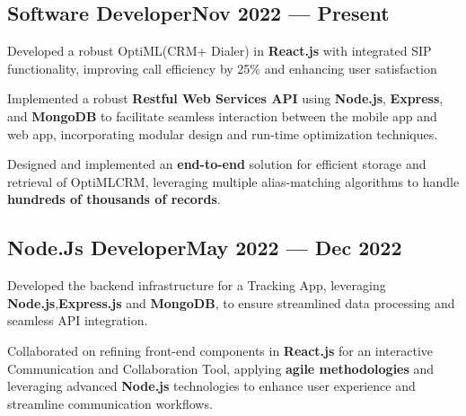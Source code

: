 \subsection{{Software Developer\hfill Nov 2022 --- Present}}
\begin{zitemize}
\item Developed a robust OptiML(CRM+ Dialer) in \textbf{React.js} with
integrated SIP functionality, improving call
efficiency by 25\% and enhancing user
satisfaction 
\item Implemented a robust \textbf{Restful Web Services API} using \textbf{Node.js}, \textbf{Express}, and \textbf{MongoDB} to facilitate seamless interaction between the mobile app and web app, incorporating modular design and run-time optimization techniques.
\item Designed and implemented an \textbf{end-to-end} solution for efficient storage and retrieval of OptiMLCRM, leveraging multiple alias-matching algorithms to handle \textbf{hundreds of thousands of records}.
\end{zitemize}

\subsection{{Node.Js Developer\hfill May 2022 --- Dec 2022}}
\begin{zitemize}
\item Developed the backend infrastructure for a Tracking App, leveraging \textbf{Node.js},\textbf{Express.js} and \textbf{MongoDB}, to ensure streamlined data processing and seamless API integration.
\item Collaborated on refining front-end components in \textbf{React.js} for an interactive Communication and Collaboration Tool, applying \textbf{agile methodologies} and leveraging advanced \textbf{Node.js} technologies to enhance user experience and streamline communication workflows.
\end{zitemize}

